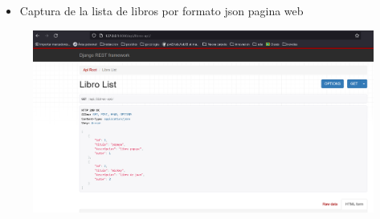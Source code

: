 \documentclass{article}
\begin{document}
	\clearpage
	\begin{itemize}
		\item Captura de la lista de libros por formato json pagina web
	\end{itemize}
	\begin{figure}[H]
		\centering
		\includegraphics[width=1\textwidth,keepaspectratio]{pruebas/tarea-libros.png}
	\end{figure}
	\clearpage	
	
	
\end{document}
